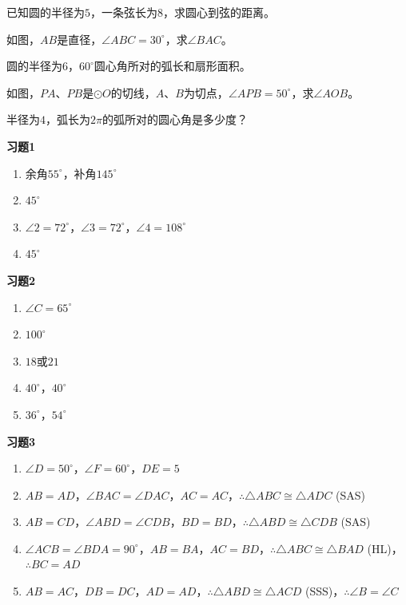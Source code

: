 \documentclass[a4paper,12pt]{ctexart}
\begin{document}



\begin{exercise}
\item 已知圆的半径为$5$，一条弦长为$8$，求圆心到弦的距离。
\item 如图，$AB$是直径，$\angle ABC=30^\circ$，求$\angle BAC$。
\item 圆的半径为$6$，$60^\circ$圆心角所对的弧长和扇形面积。
\item 如图，$PA$、$PB$是$\odot O$的切线，$A$、$B$为切点，$\angle APB=50^\circ$，求$\angle AOB$。
\item 半径为$4$，弧长为$2\pi$的弧所对的圆心角是多少度？
\end{exercise}

\newpage
{}

\textbf{习题1}
\begin{enumerate}
\item 余角$55^\circ$，补角$145^\circ$
\item $45^\circ$
\item $\angle2=72^\circ$，$\angle3=72^\circ$，$\angle4=108^\circ$
\item $45^\circ$
\end{enumerate}

\textbf{习题2}
\begin{enumerate}
\item $\angle C=65^\circ$
\item $100^\circ$
\item $18$或$21$
\item $40^\circ$，$40^\circ$
\item $36^\circ$，$54^\circ$
\end{enumerate}

\textbf{习题3}
\begin{enumerate}
\item $\angle D=50^\circ$，$\angle F=60^\circ$，$DE=5$
\item $AB=AD$，$\angle BAC=\angle DAC$，$AC=AC$，$\therefore\triangle ABC\cong\triangle ADC$ (SAS)
\item $AB=CD$，$\angle ABD=\angle CDB$，$BD=BD$，$\therefore\triangle ABD\cong\triangle CDB$ (SAS)
\item $\angle ACB=\angle BDA=90^\circ$，$AB=BA$，$AC=BD$，$\therefore\triangle ABC\cong\triangle BAD$ (HL)，$\therefore BC=AD$
\item $AB=AC$，$DB=DC$，$AD=AD$，$\therefore\triangle ABD\cong\triangle ACD$ (SSS)，$\therefore\angle B=\angle C$
\end{enumerate}
\end{document}

